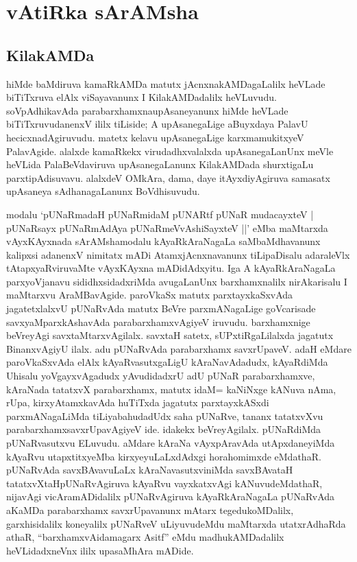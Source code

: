 \chapter{vAtiRka sArAMsha}


\section*{KilakAMDa}

\begin{artha}
hiMde baMdiruva kamaRkAMDa matutx jAcnxnakAMDagaLalilx heVLade biTiTxruva elAlx viSayavanunx I KilakAMDadalilx heVLuvudu. soVpAdhikavAda parabarxhamxna\break upAsaneyanunx hiMde heVLade biTiTxruvudanenxV ililx tiLiside; A upAsanegaLige aBuyxdaya PalavU hecicxnadAgiruvudu. matetx kelavu upAsanegaLige karxmamukitxyeV PalavAgide. alalxde kamaRkekx virudadhxvalalxda upAsanegaLanUnx meVle heVLida PalaBeVdaviruva upAsanegaLanunx KilakAMDada shurxtigaLu parxtipAdisuvavu. alalxdeV OMkAra, dama, daye itAyxdiyAgiruva samasatx upAsaneya sAdhanagaLanunx BoVdhisuvudu.
\end{artha}


\begin{artha}
modalu `pUNaRmadaH pUNaRmidaM pUNARtf pUNaR mudacayxteV |
pUNaRsayx pUNaRmAdAya pUNaRmeVvAshiSayxteV ||'
eMba maMtarxda vAyxKAyxnada sArAMsha\ndash  modalu kAyaRkAraNagaLa saMbaMdhavanunx kalipxsi adanenxV nimitatx mADi AtamxjAcnxnavanunx tiLipaDisalu adaraleVlx tAtapxyaRviruvaMte vAyxKAyxna mADidAdxyitu. Iga A kAyaRkAraNagaLa parxyoVjanavu sididhxsidadxriMda avugaLanUnx barxhamxnalilx nirAkarisalu I maMtarxvu AraMBavAgide. paroVkaSx matutx parxtayxkaSxvAda jagatetxlalxvU pUNaRvAda matutx BeVre parxmANagaLige goVcarisade savxyaMparxkAshavAda parabarxhamxvAgiyeV iruvudu. barxhamxnige beVreyAgi savxtaMtarxvAgilalx. savxtaH satetx, sUPxtiRgaLilalxda jagatutx BinanxvAgiyU ilalx. adu pUNaRvAda parabarxhamx savxrUpaveV. adaH eMdare paroVkaSxvAda elAlx kAyaRvasutxgaLigU kAraNavAdadudx, kAyaRdiMda Uhisalu yoVgayxvAgadudx yAvudidadxrU adU pUNaR parabarxhamxve, kAraNada tatatxvX parabarxhamx, matutx idaM= kaNiNxge kANuva nAma, rUpa, kirxyAtamxkavAda huTiTxda jagatutx parxtayxkASxdi parxmANagaLiMda tiLiyabahudadUdx saha pUNaRve, tananx tatatxvXvu parabarxhamxsavxrUpavAgiyeV ide. idakekx beVreyAgilalx. pUNaRdiMda pUNaRvasutxvu ELuvudu. aMdare kAraNa vAyxpAravAda utApxdaneyiMda kAyaRvu utapxtitxyeMba kirxyeyuLaLxdAdxgi horahomimxde eMdathaR. pUNaRvAda savxBAvavuLaLx kAraNavasutxviniMda savxBAvataH tatatxvXtaH\break pUNaRvAgiruva kAyaRvu vayxkatxvAgi kANuvudeMdathaR, nijavAgi vicAramADidalilx pUNaRvAgiruva kAyaRkAraNagaLa pUNaRvAda aKaMDa parabarxhamx savxrUpavanunx mAtarx tegedukoMDalilx, garxhisidalilx koneyalilx pUNaRveV uLiyuvudeMdu maMtarxda utatxrAdhaRda athaR, ``barxhamxvAidamagarx Asitf'' eMdu madhukAMDadalilx heVLidadxneVnx ililx upasaMhAra mADide.
\end{artha}

